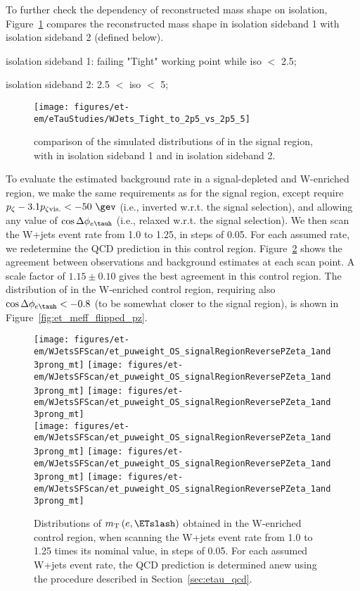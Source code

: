 To further check the dependency of reconstructed mass shape on
\tauh isolation, Figure~\ref{fig:et-w-shape2} compares the reconstructed
mass shape in \tauh isolation sideband 1 with \tauh isolation sideband 2 (defined below).

\tauh isolation sideband 1: \tauh failing "Tight" working point while \tauh iso $<$ 2.5;

\tauh isolation sideband 2: 2.5 $<$ \tauh iso $<$ 5;

\begin{figure}\centering
  \texttt{[image: figures/et-em/eTauStudies/WJets\_Tight\_to\_2p5\_vs\_2p5\_5]}
  \caption{\label{fig:et-w-shape2} comparison of the simulated
    distributions of \meffetau in the signal region, with \tauh in isolation sideband 1 and 
\tauh in isolation sideband 2.}
\end{figure}

To evaluate the estimated background rate in a signal-depleted and
W-enriched region, we make the same requirements as for the signal
region, except require $p_{\zeta} - 3.1 p_{\zeta\mathrm{vis.}}<
-50~\gev$ (i.e., inverted w.r.t. the signal selection), and allowing
any value of $\cos{\Delta\phi_{e\tauh}}$ (i.e., relaxed w.r.t. the
signal selection).  We then scan the W+jets event rate from 1.0 to
1.25, in steps of 0.05.  For each assumed rate, we redetermine the QCD
prediction in this control region.  Figure~\ref{fig:etau_w_sf} shows
the agreement between observations and background estimates at each
scan point.  A scale factor of $1.15\pm0.10$ gives the best agreement
in this control region.  The distribution of \meffetau in the
W-enriched control region, requiring also
$\cos{\Delta\phi_{e\tauh}}<-0.8$ (to be somewhat closer to the signal
region), is shown in Figure~\ref{fig:et_meff_flipped_pz}.

\begin{figure}\centering
  \texttt{[image: figures/et-em/WJetsSFScan/et\_puweight\_OS\_signalRegionReversePZeta\_1and3prong\_mt]}
  \texttt{[image: figures/et-em/WJetsSFScan/et\_puweight\_OS\_signalRegionReversePZeta\_1and3prong\_mt]}
  \texttt{[image: figures/et-em/WJetsSFScan/et\_puweight\_OS\_signalRegionReversePZeta\_1and3prong\_mt]}\\
  \texttt{[image: figures/et-em/WJetsSFScan/et\_puweight\_OS\_signalRegionReversePZeta\_1and3prong\_mt]}
  \texttt{[image: figures/et-em/WJetsSFScan/et\_puweight\_OS\_signalRegionReversePZeta\_1and3prong\_mt]}
  \texttt{[image: figures/et-em/WJetsSFScan/et\_puweight\_OS\_signalRegionReversePZeta\_1and3prong\_mt]}
  \caption{\label{fig:etau_w_sf} Distributions of
    $m_\mathrm{T}\left(e,\ETslash\right)$ obtained in the W-enriched
    control region, when scanning the W+jets event rate from 1.0 to
    1.25 times its nominal value, in steps of 0.05.  For each assumed
    W+jets event rate, the QCD prediction is determined anew using the
    procedure described in Section~\ref{sec:etau_qcd}.}
\end{figure}

